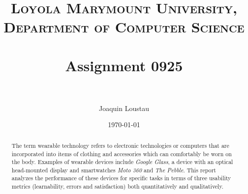 \documentclass[11pt,a4paper]{scrartcl}
\title{	
\normalfont \normalsize 
\textsc{Loyola Marymount University, Department of Computer Science} \\ [25pt] 
\horrule{0.5pt} \\[0.4cm]
\huge Assignment 0925 \\ 
\horrule{2pt} \\[0.5cm]}
\author{Joaquin Loustau\\}
\date{\normalsize\today}
\begin{document}
\maketitle
\begin{abstract}
The term wearable technology refers to electronic technologies or computers that are incorporated into items of clothing and accessories which can comfortably be worn on the body. Examples of wearable devices include \textit{Google Glass}, a device with an optical head-mounted display and smartwatches \textit{Moto 360} and \textit{The Pebble}. This report analyzes the performance of these devices for specific tasks in terms of three usability metrics (learnability, errors and satisfaction) both quantitatively and qualitatively.
\end{abstract}

\end{document}
